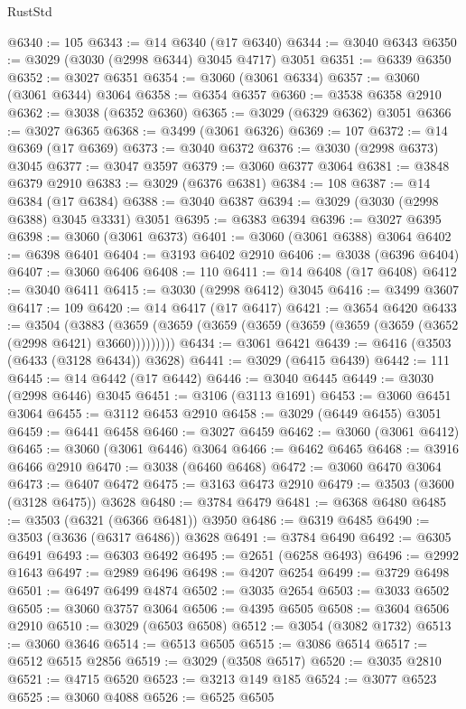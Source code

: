 \begin{lexlean}{RustStd}
\begin{coremodule}
@6340 := 105
@6343 := @14 @6340 (@17 @6340)
@6344 := @3040 @6343
@6350 := @3029 (@3030 (@2998 @6344) @3045 @4717) @3051
@6351 := @6339 @6350
@6352 := @3027 @6351
@6354 := @3060 (@3061 @6334)
@6357 := @3060 (@3061 @6344) @3064
@6358 := @6354 @6357
@6360 := @3538 @6358 @2910
@6362 := @3038 (@6352 @6360)
@6365 := @3029 (@6329 @6362) @3051
@6366 := @3027 @6365
@6368 := @3499 (@3061 @6326)
@6369 := 107
@6372 := @14 @6369 (@17 @6369)
@6373 := @3040 @6372
@6376 := @3030 (@2998 @6373) @3045
@6377 := @3047 @3597
@6379 := @3060 @6377 @3064
@6381 := @3848 @6379 @2910
@6383 := @3029 (@6376 @6381)
@6384 := 108
@6387 := @14 @6384 (@17 @6384)
@6388 := @3040 @6387
@6394 := @3029 (@3030 (@2998 @6388) @3045 @3331) @3051
@6395 := @6383 @6394
@6396 := @3027 @6395
@6398 := @3060 (@3061 @6373)
@6401 := @3060 (@3061 @6388) @3064
@6402 := @6398 @6401
@6404 := @3193 @6402 @2910
@6406 := @3038 (@6396 @6404)
@6407 := @3060 @6406
@6408 := 110
@6411 := @14 @6408 (@17 @6408)
@6412 := @3040 @6411
@6415 := @3030 (@2998 @6412) @3045
@6416 := @3499 @3607
@6417 := 109
@6420 := @14 @6417 (@17 @6417)
@6421 := @3654 @6420
@6433 := @3504
    (@3883 (@3659 (@3659 (@3659 (@3659 (@3659 (@3659 (@3659 (@3652 (@2998 @6421) @3660)))))))))
@6434 := @3061 @6421
@6439 := @6416 (@3503 (@6433 (@3128 @6434)) @3628)
@6441 := @3029 (@6415 @6439)
@6442 := 111
@6445 := @14 @6442 (@17 @6442)
@6446 := @3040 @6445
@6449 := @3030 (@2998 @6446) @3045
@6451 := @3106 (@3113 @1691)
@6453 := @3060 @6451 @3064
@6455 := @3112 @6453 @2910
@6458 := @3029 (@6449 @6455) @3051
@6459 := @6441 @6458
@6460 := @3027 @6459
@6462 := @3060 (@3061 @6412)
@6465 := @3060 (@3061 @6446) @3064
@6466 := @6462 @6465
@6468 := @3916 @6466 @2910
@6470 := @3038 (@6460 @6468)
@6472 := @3060 @6470 @3064
@6473 := @6407 @6472
@6475 := @3163 @6473 @2910
@6479 := @3503 (@3600 (@3128 @6475)) @3628
@6480 := @3784 @6479
@6481 := @6368 @6480
@6485 := @3503 (@6321 (@6366 @6481)) @3950
@6486 := @6319 @6485
@6490 := @3503 (@3636 (@6317 @6486)) @3628
@6491 := @3784 @6490
@6492 := @6305 @6491
@6493 := @6303 @6492
@6495 := @2651 (@6258 @6493)
@6496 := @2992 @1643
@6497 := @2989 @6496
@6498 := @4207 @6254
@6499 := @3729 @6498
@6501 := @6497 @6499 @4874
@6502 := @3035 @2654
@6503 := @3033 @6502
@6505 := @3060 @3757 @3064
@6506 := @4395 @6505
@6508 := @3604 @6506 @2910
@6510 := @3029 (@6503 @6508)
@6512 := @3054 (@3082 @1732)
@6513 := @3060 @3646
@6514 := @6513 @6505
@6515 := @3086 @6514
@6517 := @6512 @6515 @2856
@6519 := @3029 (@3508 @6517)
@6520 := @3035 @2810
@6521 := @4715 @6520
@6523 := @3213 @149 @185
@6524 := @3077 @6523
@6525 := @3060 @4088
@6526 := @6525 @6505

\end{coremodule}
\end{lexlean}
